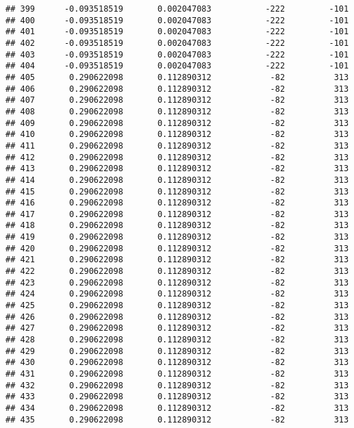 \documentclass[]{article}
\begin{document}
\begin{verbatim}
## 399      -0.093518519       0.002047083           -222         -101
## 400      -0.093518519       0.002047083           -222         -101
## 401      -0.093518519       0.002047083           -222         -101
## 402      -0.093518519       0.002047083           -222         -101
## 403      -0.093518519       0.002047083           -222         -101
## 404      -0.093518519       0.002047083           -222         -101
## 405       0.290622098       0.112890312            -82          313
## 406       0.290622098       0.112890312            -82          313
## 407       0.290622098       0.112890312            -82          313
## 408       0.290622098       0.112890312            -82          313
## 409       0.290622098       0.112890312            -82          313
## 410       0.290622098       0.112890312            -82          313
## 411       0.290622098       0.112890312            -82          313
## 412       0.290622098       0.112890312            -82          313
## 413       0.290622098       0.112890312            -82          313
## 414       0.290622098       0.112890312            -82          313
## 415       0.290622098       0.112890312            -82          313
## 416       0.290622098       0.112890312            -82          313
## 417       0.290622098       0.112890312            -82          313
## 418       0.290622098       0.112890312            -82          313
## 419       0.290622098       0.112890312            -82          313
## 420       0.290622098       0.112890312            -82          313
## 421       0.290622098       0.112890312            -82          313
## 422       0.290622098       0.112890312            -82          313
## 423       0.290622098       0.112890312            -82          313
## 424       0.290622098       0.112890312            -82          313
## 425       0.290622098       0.112890312            -82          313
## 426       0.290622098       0.112890312            -82          313
## 427       0.290622098       0.112890312            -82          313
## 428       0.290622098       0.112890312            -82          313
## 429       0.290622098       0.112890312            -82          313
## 430       0.290622098       0.112890312            -82          313
## 431       0.290622098       0.112890312            -82          313
## 432       0.290622098       0.112890312            -82          313
## 433       0.290622098       0.112890312            -82          313
## 434       0.290622098       0.112890312            -82          313
## 435       0.290622098       0.112890312            -82          313

\end{verbatim}
\end{document}
